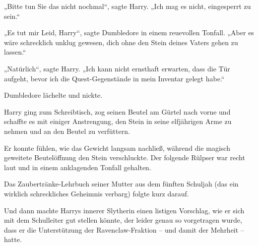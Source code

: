 „Bitte tun Sie das nicht nochmal“, sagte Harry. „Ich mag es nicht, eingesperrt zu sein.“

„Es tut mir Leid, Harry“, sagte Dumbledore in einem reuevollen Tonfall. „Aber es wäre schrecklich unklug gewesen, dich ohne den Stein deines Vaters gehen zu lassen.“

„Natürlich“, sagte Harry. „Ich kann nicht ernsthaft erwarten, dass die Tür aufgeht, bevor ich die Quest-Gegenstände in mein Inventar gelegt habe.“

Dumbledore lächelte und nickte.

Harry ging zum Schreibtisch, zog seinen Beutel am Gürtel nach vorne und schaffte es mit einiger Anstrengung, den Stein in seine elfjährigen Arme zu nehmen und an den Beutel zu verfüttern.

Er konnte fühlen, wie das Gewicht langsam nachließ, während die magisch geweitete Beutelöffnung den Stein verschluckte. Der folgende Rülpser war recht laut und in einem anklagenden Tonfall gehalten.

Das Zaubertränke-Lehrbuch seiner Mutter aus dem fünften Schuljah (das ein wirklich schreckliches Geheimnis verbarg) folgte kurz darauf.

Und dann machte Harrys innerer Slytherin einen listigen Vorschlag, wie er sich mit dem Schulleiter gut stellen könnte, der leider genau so vorgetragen wurde, dass er die Unterstützung der Ravenclaw-Fraktion – und damit der Mehrheit – hatte.

